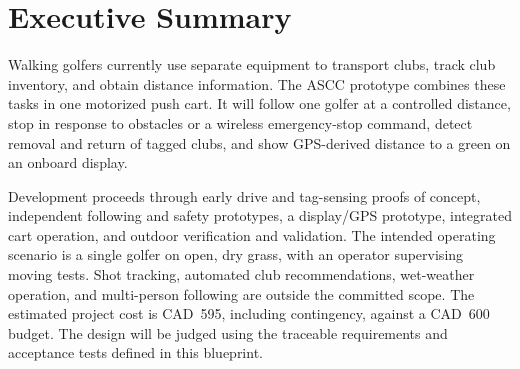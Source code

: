 \section*{Executive Summary}
Walking golfers currently use separate equipment to transport clubs, track club inventory, and obtain distance information. The ASCC prototype combines these tasks in one motorized push cart. It will follow one golfer at a controlled distance, stop in response to obstacles or a wireless emergency-stop command, detect removal and return of tagged clubs, and show GPS-derived distance to a green on an onboard display.

Development proceeds through early drive and tag-sensing proofs of concept, independent following and safety prototypes, a display/GPS prototype, integrated cart operation, and outdoor verification and validation. The intended operating scenario is a single golfer on open, dry grass, with an operator supervising moving tests. Shot tracking, automated club recommendations, wet-weather operation, and multi-person following are outside the committed scope. The estimated project cost is CAD~595, including contingency, against a CAD~600 budget. The design will be judged using the traceable requirements and acceptance tests defined in this blueprint.\clearpage
